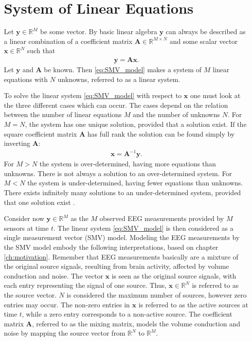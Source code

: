 \section{System of Linear Equations}\label{sec:SMV}
Let $\mathbf{y} \in \mathbb{R}^M$ be some vector. By basic linear algebra $\mathbf{y}$ can always be described as a linear combination of a coefficient matrix $\mathbf{A} \in \mathbb{R}^{M \times N}$ and some scalar vector $\mathbf{x} \in \mathbb{R}^N$ such that
\begin{align}\label{eq:SMV_model}
\mathbf{y} = \mathbf{Ax}.
\end{align}
Let $\mathbf{y}$ and $\mathbf{A}$ be known. Then \eqref{eq:SMV_model} makes a system of $M$ linear equations with $N$ unknowns, referred to as a linear system. 

To solve the linear system \eqref{eq:SMV_model} with respect to $\mathbf{x}$ one must look at the three different cases which can occur. 
The cases depend on the relation between the number of linear equations $M$ and the number of unknowns $N$.
For $M = N$, the system has one unique solution, provided that a solution exist. 
If the square coefficient matrix $\mathbf{A}$ has full rank the solution can be found simply by inverting $\mathbf{A}$:
\begin{align*}
\mathbf{x} = \mathbf{A}^{-1} \mathbf{y}.
\end{align*}
For $M > N$ the system is over-determined, having more equations than unknowns. 
There is not always a solution to an over-determined system. 
For $M < N$ the system is under-determined, having fewer equations than unknowns. 
There exists infinitely many solutions to an under-determined system, provided that one solution exist \cite[p. ix]{CS}.  

Consider now $\mathbf{y} \in \mathbb{R}^M$ as the $M$ observed EEG measurements provided by $M$ sensors at time $t$. 
The linear system \eqref{eq:SMV_model} is then considered as a single measurement vector (SMV) model. 
Modeling the EEG measurements by the SMV model embody the following interpretations, based on chapter \ref{ch:motivation}.
Remember that EEG measurements basically are a mixture of the original source signals, resulting from brain activity, affected by volume conduction and noise.
The vector $\mathbf{x}$ is seen as the original source signals, with each entry representing the signal of one source. 
Thus, $\mathbf{x} \in \mathbb{R}^N$ is referred to as the source vector. 
$N$ is considered the maximum number of sources, however zero entries may occur. 
The non-zero entries in $\mathbf{x}$ is referred to as the active sources at time $t$, while a zero entry corresponds to a non-active source.   
The coefficient matrix $\mathbf{A}$, referred to as the mixing matrix, models the volume conduction and noise by mapping the source vector from $\mathbb{R}^N$ to $\mathbb{R}^M$.            

